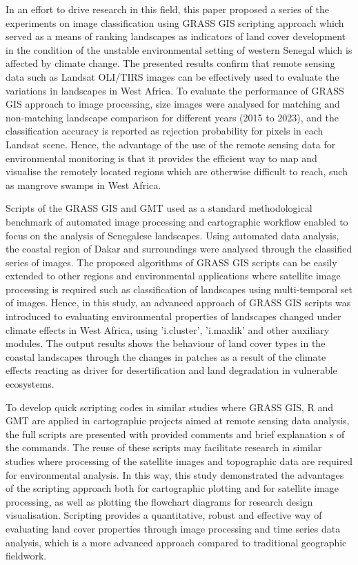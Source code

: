 \documentclass[earth,article,submit,pdftex,moreauthors]{Definitions/mdpi}
\begin{document}
In an effort to drive research in this field, this paper proposed a series of the experiments on image classification using GRASS GIS scripting approach which served as a means of ranking landscapes as indicators of land cover development in the condition of the unstable environmental setting of western Senegal which is affected by climate change. The presented results confirm that remote sensing data such as Landsat OLI/TIRS images can be effectively used to evaluate the variations in landscapes in West Africa. To evaluate the performance of GRASS GIS approach to image processing, size images were analysed for matching and non-matching landscape comparison for different years (2015 to 2023), and the classification accuracy is reported as rejection probability for pixels in each Landsat scene. Hence, the advantage of the use of the remote sensing data for environmental monitoring is that it provides the efficient way to map and visualise the remotely located regions which are otherwise difficult to reach, such as mangrove swamps in West Africa. 

Scripts of the GRASS GIS and GMT used as a standard methodological benchmark of automated image processing and cartographic workflow enabled to focus on the analysis of Senegalese landscapes. Using automated data analysis, the coastal region of Dakar and surroundings were analysed through the classified series of images. The proposed algorithms of GRASS GIS scripts can be easily extended to other regions and environmental applications where satellite image processing is required such as classification of landscapes using multi-temporal set of images. Hence, in this study, an advanced approach of GRASS GIS scripts was  introduced to evaluating environmental properties of landscapes changed under climate effects in West Africa, using 'i.cluster', 'i.maxlik' and other auxiliary modules. The output results shows the behaviour of land cover types in the coastal landscapes through the changes in patches as a result of the climate effects reacting as driver for desertification and land degradation in vulnerable ecosystems. 

To develop quick scripting codes in similar studies where GRASS GIS, R and GMT are applied in cartographic projects aimed at remote sensing data analysis, the full scripts are presented with provided comments and brief explanation s of the commands. The reuse of these scripts may facilitate research in similar studies where processing of the satellite images and topographic data are required for environmental analysis. In this way, this study demonstrated the advantages of the scripting approach both for cartographic plotting and for satellite image processing, as well as plotting the flowchart diagrams for research design visualisation. Scripting provides a quantitative, robust and effective way of evaluating land cover properties through image processing and time series data analysis, which is a more advanced approach compared to traditional geographic fieldwork. 
\end{document}
